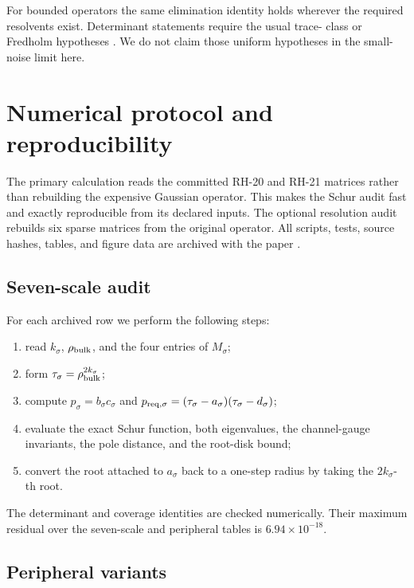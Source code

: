 \documentclass[11pt]{article}
\theoremstyle{definition}
\theoremstyle{remark}
\begin{document}
For bounded operators the same elimination identity holds wherever the
required resolvents exist.  Determinant statements require the usual trace-
class or Fredholm hypotheses \citep{GohbergKrein1969,Baladi2000}.  We do not
claim those uniform hypotheses in the small-noise limit here.

\section{Numerical protocol and reproducibility}
\label{sec:numerics}

The primary calculation reads the committed RH-20 and RH-21 matrices rather
than rebuilding the expensive Gaussian operator.  This makes the Schur
audit fast and exactly reproducible from its declared inputs.  The optional
resolution audit rebuilds six sparse matrices from the original operator.
All scripts, tests, source hashes, tables, and figure data are archived with
the paper \citep{WangDarkSchurCode2026}.

\subsection{Seven-scale audit}

For each archived row we perform the following steps:
\begin{enumerate}[label=\arabic*.,leftmargin=2.2em]
 \item read $k_\sigma$, $\rho_{\rm bulk}$, and the four entries of
 $M_\sigma$;
 \item form $\tau_\sigma=\rho_{\rm bulk}^{2k_\sigma}$;
 \item compute $p_\sigma=b_\sigma c_\sigma$ and
 $p_{{\rm req},\sigma}=(\tau_\sigma-a_\sigma)
 (\tau_\sigma-d_\sigma)$;
 \item evaluate the exact Schur function, both eigenvalues, the
 channel-gauge invariants, the pole distance, and the root-disk bound;
 \item convert the root attached to $a_\sigma$ back to a one-step radius by
 taking the $2k_\sigma$-th root.
\end{enumerate}
The determinant and coverage identities are checked numerically.  Their
maximum residual over the seven-scale and peripheral tables is
$6.94\times10^{-18}$.

\subsection{Peripheral variants}
\end{document}
